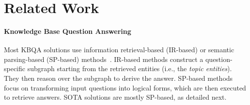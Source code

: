 \section{Related Work}
\label{sec:literature}

\paragraph{Knowledge Base Question Answering}

Most KBQA 
solutions use {information retrieval-based} (IR-based) or {semantic parsing-based} (SP-based) methods~\cite{wu_survey_2019,lan_survey_2021}. IR-based methods construct a question-specific subgraph starting from the retrieved entities (i.e., the \emph{topic entities}). They then reason over  the  subgraph to derive the answer. SP-based methods focus on transforming input questions into logical forms, which are then executed to retrieve answers. %
SOTA solutions are mostly SP-based, as detailed next.






